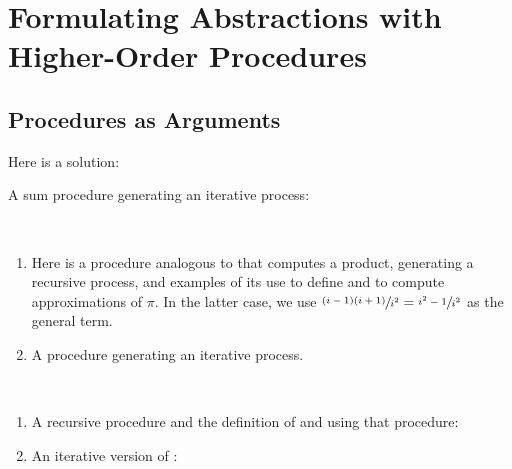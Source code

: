 \section{Formulating Abstractions with Higher-Order Procedures}

\subsection{Procedures as Arguments}

\begin{exe}[1.29]
    Here is a solution:
\end{exe}

\begin{exe}[1.30]
    A sum procedure generating an iterative process:
\end{exe}

\begin{exe}[1.31]
    \ \vspace{-20pt}
    \begin{enumerate}
        \item Here is a procedure analogous to  that computes 
            a product, generating a recursive process, and examples of its use 
            to define  and to compute approximations of $\pi$. 
            In the latter case, we use $\sfrac{(i - 1)(i + 1)}{i^2} = \sfrac{i^2 
            - 1}{i^2}$ as the general term.
        \item A  procedure generating an iterative process.
    \end{enumerate}
\end{exe}

\begin{exe}[1.32]
    \ \vspace{-20pt}
    \begin{enumerate}
        \item A recursive  procedure and the definition of 
             and  using that procedure:
        \item An iterative version of :
    \end{enumerate}
\end{exe}

